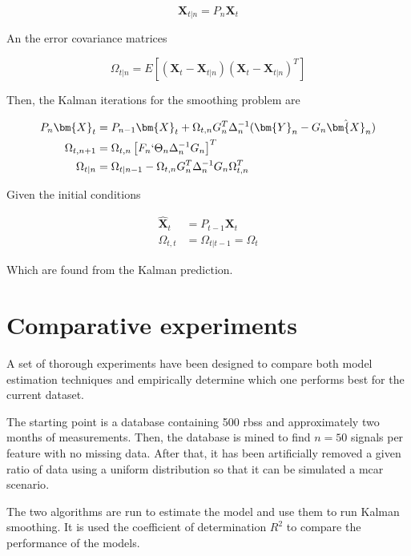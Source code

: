 \begin{equation}
	\bm{X}_{t|n} = P_n \bm{X}_t
\end{equation}

An the error covariance matrices\cite{brockwell2016introduction}

\begin{equation}
	\Omega_{t|n} = E \left[(\bm{X}_{t} - \bm{X}_{t|n})(\bm{X}_{t} - \bm{X}_{t|n})^T \right]
\end{equation}

Then, the Kalman iterations for the smoothing problem are \cite{brockwell2016introduction}

\begin{align}
	P_n \bm{X}_t	
	&= 
	P_{n-1} \bm{X}_t + \Omega_{t,n} G_n^T \Delta_n^{-1} (\bm{Y}_n - G_n \hat{\bm{X}}_n) 
	\\
	\Omega_{t,n+1} 		
	&=
	\Omega_{t,n} \left[ F_n `\Theta_n \Delta_n^{-1} G_n \right]^T
	\\
	\Omega_{t|n}
	&=
	\Omega_{t|n-1} - \Omega_{t,n} G_n^T \Delta_n^{-1} G_n \Omega_{t,n}^T
\end{align}

Given the initial conditions

\begin{align}
	\hat{\bm{X}}_t &= P_{t-1} \bm{X}_t \\
	\Omega_{t,t} &= \Omega_{t|t-1} = \Omega_t
\end{align}

Which are found from the Kalman prediction.

\section{Comparative experiments}

A set of thorough experiments have been designed to compare both model estimation techniques and empirically determine which one performs best for the current dataset.

The starting point is a database containing 500 \acp{rbs} and approximately two months of measurements. Then, the database is mined to find $n=50$ signals per feature with no missing data. After that, it has been artificially removed a given ratio of data using a uniform distribution so that it can be simulated a \ac{mcar} scenario\cite{rantou2017missing}. 

The two algorithms are run to estimate the model and use them to run Kalman smoothing. It is used the coefficient of determination $R^2$ to compare the performance of the models. 

